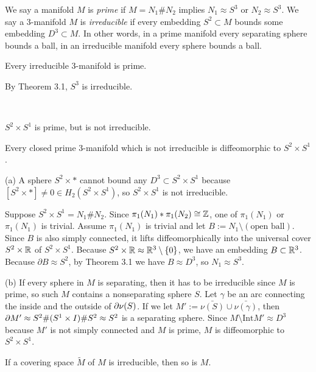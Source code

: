 \documentclass{../../small}
\begin{document}
We say a manifold $M$ is \emph{prime} if $M=N_1\# N_2$ implies $N_1\approx S^3$ or $N_2\approx S^3$.
We say a 3-manifold $M$ is \emph{irreducible} if every embedding $S^2\subset M$ bounds some embedding $D^3\subset M$.
In other words, in a prime manifold every separating sphere bounds a ball, in an irreducible manifold every sphere bounds a ball.

\begin{cor}
Every irreducible 3-manifold is prime.
\end{cor}
\begin{cor}
By Theorem 3.1, $S^3$ is irreducible.
\end{cor}
\begin{thm}\,
\begin{parts}
\item $S^2\times S^1$ is prime, but is not irreducible.
\item Every closed prime 3-manifold which is not irreducible is diffeomorphic to $S^2\times S^1$.
\end{parts}
\end{thm}
\begin{pf}
(a)
A sphere $S^2\times *$ cannot bound any $D^3\subset S^2\times S^1$ because $[S^2\times *]\ne0\in H_2(S^2\times S^1)$, so $S^2\times S^1$ is not irreducible.

Suppose $S^2\times S^1=N_1\# N_2$.
Since $\pi_1(N_1)*\pi_1(N_2)\cong\mathbb{Z}$, one of $\pi_1(N_1)$ or $\pi_1(N_1)$ is trivial.
Assume $\pi_1(N_1)$ is trivial and let $B:=N_1\setminus(\text{open ball})$.
Since $B$ is also simply connected, it lifts diffeomorphically into the universal cover $S^2\times\mathbb{R}$ of $S^2\times S^1$.
Because $S^2\times\mathbb{R}\approx\mathbb{R}^3\setminus\{0\}$, we have an embedding $B\subset\mathbb{R}^3$.
Because $\partial B\approx S^2$, by Theorem 3.1 we have $B\approx D^3$, so $N_1\approx S^3$.

(b)
If every sphere in $M$ is separating, then it has to be irreducible since $M$ is prime, so such $M$ contains a nonseparating sphere $S$.
Let $\gamma$ be an arc connecting the inside and the outside of $\pd\nu(S)$.
If we let $M':=\bar{\nu(S)}\cup\bar{\nu(\gamma)}$, then $\pd M'\approx S^2\#(S^1\times I)\#S^2\approx S^2$ is a separating sphere.
Since $M\setminus\mathrm{Int}M'\approx D^3$ because $M'$ is not simply connected and $M$ is prime, $M$ is diffeomorphic to $S^2\times S^1$.
\end{pf}

\begin{prop}
If a covering space $\tilde M$ of $M$ is irreducible, then so is $M$.
\end{prop}
\end{document}
